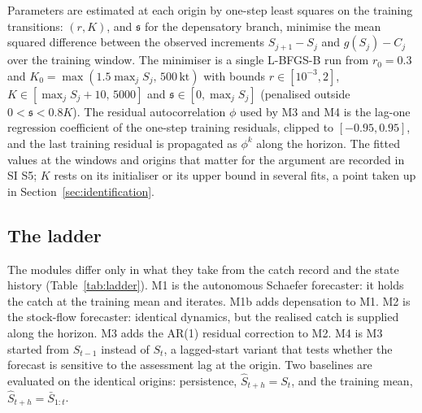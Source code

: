\documentclass[preprint,11pt,authoryear]{elsarticle}
\theoremstyle{definition}
\theoremstyle{remark}
\newcommand{\kt}{\,\mathrm{kt}}
\newcommand{\sA}{\mathfrak{s}}
\begin{document}
Parameters are estimated at each origin by one-step least squares on the training transitions: $(r,K)$, and $\sA$ for the depensatory branch, minimise the mean squared difference between the observed increments $S_{j+1}-S_j$ and $g(S_j)-C_j$ over the training window. The minimiser is a single L-BFGS-B run from $r_0 = 0.3$ and $K_0 = \max(1.5\max_j S_j,\,500\kt)$ with bounds $r\in[10^{-3},2]$, $K\in[\max_j S_j + 10,\,5000]$ and $\sA\in[0,\max_j S_j]$ (penalised outside $0<\sA<0.8K$). The residual autocorrelation $\phi$ used by M3 and M4 is the lag-one regression coefficient of the one-step training residuals, clipped to $[-0.95,0.95]$, and the last training residual is propagated as $\phi^k$ along the horizon. The fitted values at the windows and origins that matter for the argument are recorded in SI S5; $K$ rests on its initialiser or its upper bound in several fits, a point taken up in Section~\ref{sec:identification}.

\subsection{The ladder}\label{sec:ladder}

The modules differ only in what they take from the catch record and the state history (Table~\ref{tab:ladder}). M1 is the autonomous Schaefer forecaster: it holds the catch at the training mean and iterates. M1b adds depensation to M1. M2 is the stock-flow forecaster: identical dynamics, but the realised catch is supplied along the horizon. M3 adds the AR(1) residual correction to M2. M4 is M3 started from $S_{t-1}$ instead of $S_t$, a lagged-start variant that tests whether the forecast is sensitive to the assessment lag at the origin. Two baselines are evaluated on the identical origins: persistence, $\hat S_{t+h} = S_t$, and the training mean, $\hat S_{t+h} = \bar S_{1:t}$.
\end{document}
